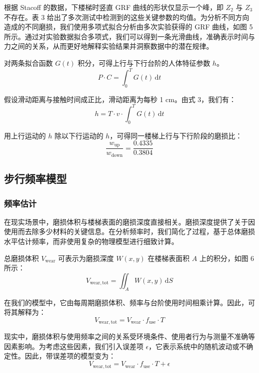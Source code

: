 \documentclass[11pt,a4paper]{ctexart}
\newcommand{\cfgup}{\mathrm{up}}
\newcommand{\cfgdown}{\mathrm{down}}
\begin{document}
根据 Stacoff 的数据，下楼梯时竖直 GRF 曲线的形状仅显示一个峰，即 $Z_2$ 与 $Z_3$ 不存在。表 3 给出了多次测试中检测到的这些关键参数的均值。为分析不同方向造成的不同磨损，我们使用多项式拟合分析由多次实验获得的 GRF 曲线，如图 5 所示。通过对实验数据拟合多项式，我们可以得到一条光滑曲线，准确表示时间与力之间的关系，从而更好地解释实验结果并洞察数据中的潜在规律。

对两条拟合函数 $G(t)$ 积分，可得上行与下行台阶的人体特征参数 $h$。
\begin{equation}
P\cdot C = \int_{0}^{T} G(t)\,\mathrm{d}t
\end{equation}

假设滑动距离与接触时间成正比，滑动距离为每秒 1 cm。由式 3，我们有：
\begin{equation}
h = T\cdot v\cdot\int_{0}^{T} G(t)\,\mathrm{d}t
\end{equation}

用上行运动的 $h$ 除以下行运动的 $h$，可得同一楼梯上行与下行阶段的磨损比：
\begin{equation}
\frac{w_{\cfgup}}{w_{\cfgdown}} = \frac{0.4335}{0.3804}
\end{equation}

\subsection{步行频率模型}

\subsubsection{频率估计}

在现实场景中，磨损体积与楼梯表面的磨损深度直接相关。磨损深度提供了关于因使用而去除多少材料的关键信息。在分析频率时，我们简化了过程，基于总体磨损水平估计频率，而非使用复杂的物理模型进行细致计算。

总磨损体积 $V_{\mathrm{wear}}$ 可表示为磨损深度 $W(x,y)$ 在楼梯表面积 $A$ 上的积分，如图 6 所示：
\begin{equation}
V_{\mathrm{wear,tot}} = \iint_{A} W(x,y)\,\mathrm{d}S
\end{equation}

在我们的模型中，它由每周期磨损体积、频率与台阶使用时间相乘计算。因此，可将其解释为：
\begin{equation}
V_{\mathrm{wear,tot}} = V_{\mathrm{wear}}\cdot f_{\mathrm{use}}\cdot T
\end{equation}

现实中，磨损体积与使用频率之间的关系受环境条件、使用者行为与测量不准确等因素影响。为考虑这些因素，我们引入误差项 $\epsilon$，它表示系统中的随机波动或不确定性。因此，带误差项的模型变为：
\begin{equation}
V_{\mathrm{wear,tot}} = V_{\mathrm{wear}}\cdot f_{\mathrm{use}}\cdot T + \epsilon
\end{equation}
\end{document}
